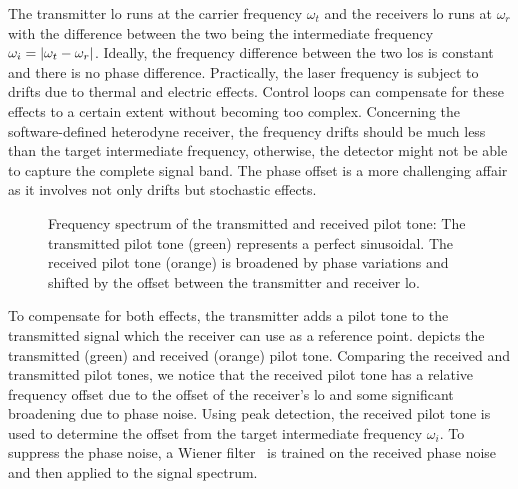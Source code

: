 The transmitter \gls{lo} runs at the carrier frequency $\omega_t$ and the receivers \gls{lo} runs at $\omega_r$ with the difference between the two being the intermediate frequency $\omega_i=\abs{\omega_t-\omega_r}$.
Ideally, the frequency difference between the two \gls{lo}s is constant and there is no phase difference.
Practically, the laser frequency is subject to drifts due to thermal and electric effects.
Control loops can compensate for these effects to a certain extent without becoming too complex.
Concerning the software-defined heterodyne receiver, the frequency drifts should be much less than the target intermediate frequency, otherwise, the detector might not be able to capture the complete signal band.
The phase offset is a more challenging affair as it involves not only drifts but stochastic effects.
\begin{figure}[htb]
	\centering
	
	\caption{Frequency spectrum of the transmitted and received pilot tone: The transmitted pilot tone (green) represents a perfect sinusoidal. The received pilot tone (orange) is broadened by phase variations and shifted by the offset between the transmitter and receiver \gls{lo}.}\label{fig:pilot_tones}
\end{figure}
To compensate for both effects, the transmitter adds a pilot tone to the transmitted signal which the receiver can use as a reference point.
 depicts the transmitted (green) and received (orange) pilot tone.
Comparing the received and transmitted pilot tones, we notice that the received pilot tone has a relative frequency offset due to the offset of the receiver's \gls{lo} and some significant broadening due to phase noise.
Using peak detection, the received pilot tone is used to determine the offset from the target intermediate frequency $\omega_i$.
To suppress the phase noise, a Wiener filter~\cite{Chen2006} is trained on the received phase noise and then applied to the signal spectrum.

